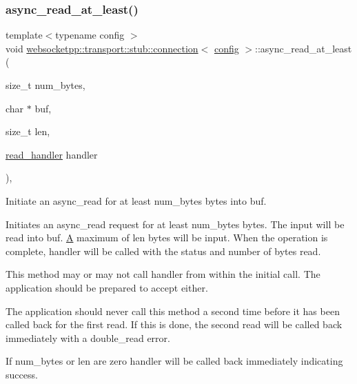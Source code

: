 \subsubsection{\texorpdfstring{async\+\_\+read\+\_\+at\+\_\+least()}{async\_read\_at\_least()}}
{\footnotesize\ttfamily template$<$typename config $>$ \\
void \mbox{\hyperlink{classwebsocketpp_1_1transport_1_1stub_1_1connection}{websocketpp\+::transport\+::stub\+::connection}}$<$ \mbox{\hyperlink{classconfig}{config}} $>$\+::async\+\_\+read\+\_\+at\+\_\+least (\begin{DoxyParamCaption}\item[{size\+\_\+t}]{num\+\_\+bytes,  }\item[{char $\ast$}]{buf,  }\item[{size\+\_\+t}]{len,  }\item[{\mbox{\hyperlink{namespacewebsocketpp_1_1transport_a3a9b2ed54dfcc6ebe7d7e6b4c02f53fb}{read\+\_\+handler}}}]{handler }\end{DoxyParamCaption})\hspace{0.3cm}{\ttfamily [inline]}, {\ttfamily [protected]}}



Initiate an async\+\_\+read for at least num\+\_\+bytes bytes into buf. 

Initiates an async\+\_\+read request for at least num\+\_\+bytes bytes. The input will be read into buf. \mbox{\hyperlink{struct_a}{A}} maximum of len bytes will be input. When the operation is complete, handler will be called with the status and number of bytes read.

This method may or may not call handler from within the initial call. The application should be prepared to accept either.

The application should never call this method a second time before it has been called back for the first read. If this is done, the second read will be called back immediately with a double\+\_\+read error.

If num\+\_\+bytes or len are zero handler will be called back immediately indicating success.


